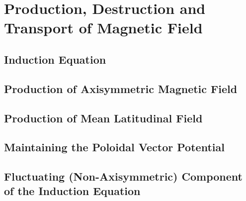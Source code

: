 
%
%
%
%

\chapter{Production, Destruction and Transport of Magnetic Field}


\section*{Induction Equation}


\section*{Production of Axisymmetric Magnetic Field}



\section*{Production of Mean Latitudinal Field}



\section*{Maintaining the Poloidal Vector Potential}



\section*{Fluctuating (Non-Axisymmetric) Component of the Induction Equation}


































